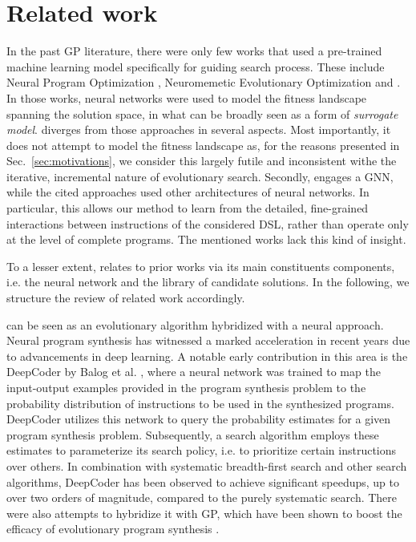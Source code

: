 \section{Related work}
\label{sec:related}

In the past GP literature, there were only few works that used a pre-trained machine learning model specifically for guiding search process. These include Neural Program Optimization \cite{Liskowski:2020:GECCO}, Neuromemetic Evolutionary Optimization \cite{10.1007/978-3-030-58112-1_43} and \cite{10.1145/3638530.3654277}. In those works, neural networks were used to model the fitness landscape spanning the solution space, in what can be broadly seen as a form of \emph{surrogate model}. \mname diverges from those approaches in several aspects. Most importantly, it does not attempt to model the fitness landscape as, for the reasons presented in Sec.\ \ref{sec:motivations}, we consider this largely futile and inconsistent withe the iterative, incremental nature of  evolutionary search. Secondly, \mname engages a GNN, while the cited approaches used other architectures of neural networks. In particular, this allows our method to learn from the detailed, fine-grained interactions between instructions of the considered DSL, rather than operate only at the level of complete programs. The mentioned works lack this kind of insight. 

To a lesser extent, \mname relates to prior works via its main constituents components, i.e. the neural network and the library of candidate solutions. In the following, we structure the review of related work accordingly.   

\mname can be seen as an evolutionary algorithm hybridized with a neural approach. Neural program synthesis has witnessed a marked acceleration in recent years due to advancements in deep learning. A notable early contribution in this area is the DeepCoder by Balog et al. \cite{2016arXiv161101989B}, where a neural network was trained to map the input-output examples provided in the program synthesis problem to the probability distribution of instructions to be used in the synthesized programs. DeepCoder utilizes this network to query the probability estimates for a given program synthesis problem. Subsequently, a search algorithm employs these estimates to parameterize its search policy, i.e. to prioritize certain instructions over others. In combination with systematic breadth-first search and other search algorithms, DeepCoder has been observed to achieve significant speedups, up to over two orders of magnitude, compared to the purely systematic search. There were also attempts to hybridize it with GP, which have been shown to boost the efficacy of evolutionary program synthesis \cite{Liskowski:2018:GECCOa}. 


